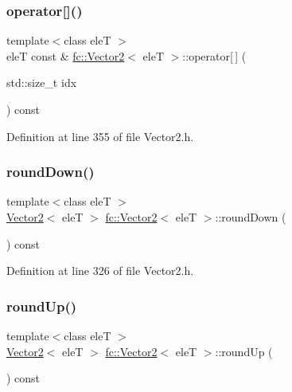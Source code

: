 \subsubsection{\texorpdfstring{operator[]()}{operator[]()}\hspace{0.1cm}{\footnotesize\ttfamily [2/2]}}
{\footnotesize\ttfamily template$<$class eleT $>$ \\
eleT const  \& \hyperlink{classfc_1_1Vector2}{fc\+::\+Vector2}$<$ eleT $>$\+::operator\mbox{[}$\,$\mbox{]} (\begin{DoxyParamCaption}\item[{std\+::size\+\_\+t}]{idx }\end{DoxyParamCaption}) const}



Definition at line 355 of file Vector2.\+h.

\mbox{\label{classfc_1_1Vector2_aa9501d6580d5a78bf1573b23019b8821}} 
\subsubsection{\texorpdfstring{round\+Down()}{roundDown()}}
{\footnotesize\ttfamily template$<$class eleT $>$ \\
\hyperlink{classfc_1_1Vector2}{Vector2}$<$ eleT $>$ \hyperlink{classfc_1_1Vector2}{fc\+::\+Vector2}$<$ eleT $>$\+::round\+Down (\begin{DoxyParamCaption}{ }\end{DoxyParamCaption}) const}



Definition at line 326 of file Vector2.\+h.

\mbox{\label{classfc_1_1Vector2_ae782de3d87d058ec441aa872348340b2}} 
\subsubsection{\texorpdfstring{round\+Up()}{roundUp()}}
{\footnotesize\ttfamily template$<$class eleT $>$ \\
\hyperlink{classfc_1_1Vector2}{Vector2}$<$ eleT $>$ \hyperlink{classfc_1_1Vector2}{fc\+::\+Vector2}$<$ eleT $>$\+::round\+Up (\begin{DoxyParamCaption}{ }\end{DoxyParamCaption}) const}



